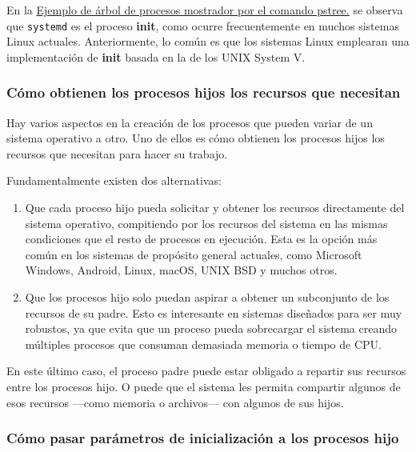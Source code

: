 En la \hyperref[fig-pstree]{Ejemplo de árbol de procesos mostrador por
el comando pstree.} se observa que \texttt{systemd} es el proceso
\textbf{{}init}, como ocurre frecuentemente en muchos sistemas Linux
actuales. Anteriormente, lo común es que los sistemas Linux emplearan
una implementación de \textbf{{}init} basada en la de los UNIX System V.

\subsubsection{Cómo obtienen los procesos hijos los recursos que
necesitan}\label{_como_obtienen_los_procesos_hijos_los_recursos_que_necesitan}

Hay varios aspectos en la creación de los procesos que pueden variar de
un sistema operativo a otro. Uno de ellos es cómo obtienen los procesos
hijos los recursos que necesitan para hacer su trabajo.

Fundamentalmente existen dos alternativas:

\begin{enumerate}
\def\labelenumi{\arabic{enumi}.}
\item
  Que cada proceso hijo pueda solicitar y obtener los recursos
  directamente del sistema operativo, compitiendo por los recursos del
  sistema en las mismas condiciones que el resto de procesos en
  ejecución. Esta es la opción más común en los sistemas de propósito
  general actuales, como Microsoft Windows, Android, Linux, macOS, UNIX
  BSD y muchos otros.
\item
  Que los procesos hijo solo puedan aspirar a obtener un subconjunto de
  los recursos de su padre. Esto es interesante en sistemas diseñados
  para ser muy robustos, ya que evita que un proceso pueda sobrecargar
  el sistema creando múltiples procesos que consuman demasiada memoria o
  tiempo de CPU.
\end{enumerate}

En este último caso, el proceso padre puede estar obligado a repartir
sus recursos entre los procesos hijo. O puede que el sistema les permita
compartir algunos de esos recursos ---como memoria o archivos--- con
algunos de sus hijos.

\subsubsection{Cómo pasar parámetros de inicialización a los procesos
hijo}\label{_como_pasar_paruxe1metros_de_inicializacion_a_los_procesos_hijo}

